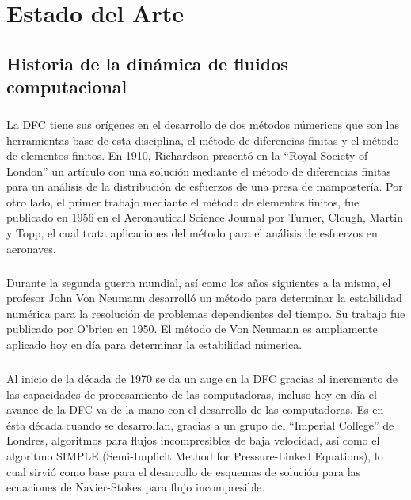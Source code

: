 \documentclass[letterpaper, openright, 12pt]{book}
\begin{document}
	\chapter{Estado del Arte}
		\section{Historia de la dinámica de fluidos computacional}
				\paragraph*{}
					La DFC tiene sus orígenes en el desarrollo de dos métodos númericos que son las herramientas base de esta disciplina, el método de diferencias finitas y el método de elementos finitos. En 1910, Richardson presentó en la ``Royal Society of London'' un artículo con una solución mediante el método de diferencias finitas para un análisis de la distribución de esfuerzos de una presa de mampostería. Por otro lado, el primer trabajo mediante el método de elementos finitos, fue publicado en 1956 en el Aeronautical Science Journal por Turner, Clough, Martin y Topp, el cual trata aplicaciones del método para el análisis de esfuerzos en aeronaves.\cite{tj-chung}
				
				\paragraph*{}
					Durante la segunda guerra mundial, así como los años siguientes a la misma, el profesor John Von Neumann desarrolló un método para determinar la estabilidad numérica para la resolución de problemas dependientes del tiempo. Su trabajo fue publicado por O'brien en 1950. El método de Von Neumann es ampliamente aplicado hoy en día para determinar la estabilidad númerica.\cite{pletcher-CFD-HeatTransfer}
					
				\paragraph*{}
					Al inicio de la década de 1970 se da un auge en la DFC gracias al incremento de las capacidades de procesamiento de las computadoras, incluso hoy en día el avance de la DFC va de la mano con el desarrollo de las computadoras.\cite{blazek} Es en ésta década cuando se desarrollan, gracias a un grupo del ``Imperial College'' de Londres, algoritmos para flujos incompresibles de baja velocidad, así como el algoritmo SIMPLE (Semi-Implicit Method for Pressure-Linked Equations), lo cual sirvió como base para el desarrollo de esquemas de solución para las ecuaciones de Navier-Stokes para flujo incompresible.\cite{pletcher-CFD-HeatTransfer}
					
\end{document}
